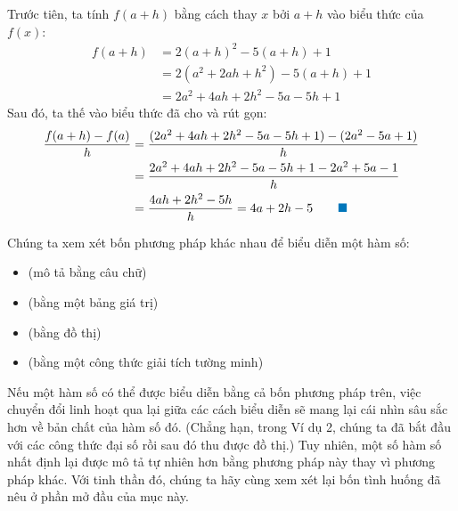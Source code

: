 \documentclass[10pt,letterpaper]{article}
\begin{document}
\begin{minipage}[t]{0.71	extwidth}
    \vspace{0.12cm}
    \quad Trước tiên, ta tính $f(a + h)$ bằng cách thay $x$ bởi $a + h$ vào biểu thức của $f(x)$:
    \begin{align*}
    f(a + h) &= 2(a + h)^2 - 5(a + h) + 1 \\
    &= 2(a^2 + 2ah + h^2) - 5(a + h) + 1 \\
    &= 2a^2 + 4ah + 2h^2 - 5a - 5h + 1
    \end{align*}
    Sau đó, ta thế vào biểu thức đã cho và rút gọn:
    \begin{align*}
    \frac{f(a + h) - f(a)}{h} &= \frac{(2a^2 + 4ah + 2h^2 - 5a - 5h + 1) - (2a^2 - 5a + 1)}{h} \\
    &= \frac{2a^2 + 4ah + 2h^2 - 5a - 5h + 1 - 2a^2 + 5a - 1}{h} \\
    &= \frac{4ah + 2h^2 - 5h}{h} = 4a + 2h - 5 \qquad {\color{stewartcyan}\blacksquare}
    \end{align*}

    \vspace{0.16cm}
    \vspace{0.12cm}

    Chúng ta xem xét bốn phương pháp khác nhau để biểu diễn một hàm số:
    \begin{itemize}[itemsep=0.04cm, topsep=0.08cm, leftmargin=1.5em]
        \item[{\color{stewartred}\textbullet}]  (mô tả bằng câu chữ)
        \item[{\color{stewartred}\textbullet}]  (bằng một bảng giá trị)
        \item[{\color{stewartred}\textbullet}]  (bằng đồ thị)
        \item[{\color{stewartred}\textbullet}]  (bằng một công thức giải tích tường minh)
    \end{itemize}
    \vspace{0.08cm}

    Nếu một hàm số có thể được biểu diễn bằng cả bốn phương pháp trên, việc chuyển đổi linh hoạt qua lại giữa các cách biểu diễn sẽ mang lại cái nhìn sâu sắc hơn về bản chất của hàm số đó. (Chẳng hạn, trong Ví dụ 2, chúng ta đã bắt đầu với các công thức đại số rồi sau đó thu được đồ thị.) Tuy nhiên, một số hàm số nhất định lại được mô tả tự nhiên hơn bằng phương pháp này thay vì phương pháp khác. Với tinh thần đó, chúng ta hãy cùng xem xét lại bốn tình huống đã nêu ở phần mở đầu của mục này.
\end{minipage}
\end{document}
